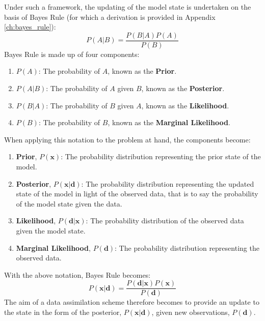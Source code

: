 Under such a framework, the updating of the model state is undertaken on the
basis of Bayes Rule (for which a derivation is provided in Appendix
\ref{ch:bayes_rule}):
\begin{equation}
    P(A|B) = \frac{P(B|A) P(A)}{P(B)}
\end{equation}
Bayes Rule is made up of four components:
\begin{enumerate}
    \item $P \left( A \right)$: The probability of $A$, known as the
        \textbf{Prior}.
    \item $P \left( A|B \right)$: The probability of $A$ given $B$, known as the
        \textbf{Posterior}.
    \item $P \left( B|A \right)$: The probability of $B$ given $A$, known as the
        \textbf{Likelihood}.
    \item $P \left( B \right)$: The probability of $B$, known as the
        \textbf{Marginal Likelihood}.
\end{enumerate}
When applying this notation to the problem at hand, the components become:
\begin{enumerate}
    \item \textbf{Prior}, $P(\mathbf{x})$: The probability distribution
        representing the prior state of the model.
    \item \textbf{Posterior}, $P(\mathbf{x}|\mathbf{d})$: The probability
        distribution representing the updated state of the model in light of the
        observed data, that is to say the probability of the model state given
        the data.
    \item \textbf{Likelihood}, $P(\mathbf{d}|\mathbf{x})$: The probability
        distribution of the observed data given the model state.
    \item \textbf{Marginal Likelihood}, $P(\mathbf{d})$: The probability
        distribution representing the observed data.
\end{enumerate}
With the above notation, Bayes Rule becomes:
\begin{equation}
    P \left( \mathbf{x} | \mathbf{d} \right) =
       \frac{P \left( \mathbf{d} | \mathbf{x} \right)
             P \left( \mathbf{x} \right)}{P \left( \mathbf{d} \right)} 
\end{equation}
The aim of a data assimilation scheme therefore becomes to provide an update to
the  state in the form of the posterior, $P \left( \mathbf{x} | \mathbf{d}
\right)$, given new observations, $P \left( \mathbf{d} \right)$.


